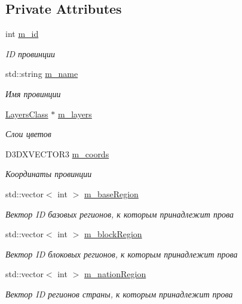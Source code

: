 \subsection*{Private Attributes}
\begin{DoxyCompactItemize}
\item 
int \hyperlink{class_prov_class_aaff00dcc3c5e75767133ec05ace7fdf6}{m\+\_\+id}
\begin{DoxyCompactList}\small\item\em ID провинции \end{DoxyCompactList}\item 
std\+::string \hyperlink{class_prov_class_ad6197fa9253423daa8bfe5d8020547b5}{m\+\_\+name}
\begin{DoxyCompactList}\small\item\em Имя провинции \end{DoxyCompactList}\item 
\hyperlink{class_layers_class}{Layers\+Class} $\ast$ \hyperlink{class_prov_class_ac52eab12a254ed06d4365215db03c103}{m\+\_\+layers}
\begin{DoxyCompactList}\small\item\em Слои цветов \end{DoxyCompactList}\item 
D3\+D\+X\+V\+E\+C\+T\+O\+R3 \hyperlink{class_prov_class_aef01dac0cdeabad98fb67a03f66f1b7d}{m\+\_\+coords}
\begin{DoxyCompactList}\small\item\em Координаты провинции \end{DoxyCompactList}\item 
std\+::vector$<$ int $>$ \hyperlink{class_prov_class_aa24dfaa725d9920c7602b04c4084a798}{m\+\_\+base\+Region}
\begin{DoxyCompactList}\small\item\em Вектор ID базовых регионов, к которым принадлежит прова \end{DoxyCompactList}\item 
std\+::vector$<$ int $>$ \hyperlink{class_prov_class_a0d008978d66ba3543ad2890161125ee6}{m\+\_\+block\+Region}
\begin{DoxyCompactList}\small\item\em Вектор ID блоковых регионов, к которым принадлежит прова \end{DoxyCompactList}\item 
std\+::vector$<$ int $>$ \hyperlink{class_prov_class_a8a75f6c2e83d2b02a94105ebdfb8aa56}{m\+\_\+nation\+Region}
\begin{DoxyCompactList}\small\item\em Вектор ID регионов страны, к которым принадлежит прова \end{DoxyCompactList}\end{DoxyCompactItemize}


